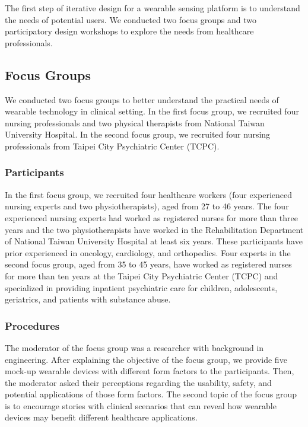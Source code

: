 The first step of iterative design for a wearable sensing platform is to understand the needs of potential users. We conducted two focus groups and two participatory design workshops to explore the needs from healthcare professionals.

\subsection{Focus Groups}
We conducted two focus groups to better understand the practical needs of wearable technology in clinical setting. In the first focus group, we recruited four nursing professionals and two physical therapists from National Taiwan University Hospital. In the second focus group, we recruited four nursing professionals from Taipei City Psychiatric Center (TCPC).

\subsubsection{Participants}
In the first focus group, we recruited four healthcare workers (four experienced nursing experts and two physiotherapists), aged from 27 to 46 years. The four experienced nursing experts had worked as registered nurses for more than three years and the two physiotherapists have worked in the Rehabilitation Department of National Taiwan University Hospital at least six years. These participants have prior experienced in oncology, cardiology, and orthopedics. Four experts in the second focus group, aged from 35 to 45 years, have worked as registered nurses for more than ten years at the Taipei City Psychiatric Center (TCPC) and specialized in providing inpatient psychiatric care for children, adolescents, geriatrics, and patients with substance abuse.

\subsubsection{Procedures}
The moderator of the focus group was a researcher with background in engineering. After explaining the objective of the focus group, we provide five mock-up wearable devices with different form factors to the participants. Then, the moderator asked their perceptions regarding the usability, safety, and potential applications of those form factors. The second topic of the focus group is to encourage stories with clinical scenarios that can reveal how wearable devices may benefit different healthcare applications.

